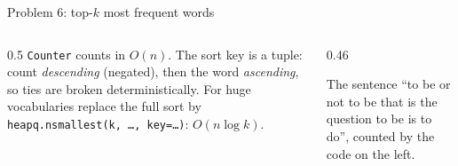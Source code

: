 \documentclass[aspectratio=169,10pt]{beamer}
\begin{document}
\begin{frame}{Problem 6: top-$k$ most frequent words}
\begin{columns}[T]
\begin{column}{0.5\textwidth}
\vspace{2mm}
\vspace{2mm}
{\small
\texttt{Counter} counts in $O(n)$. The sort key is a tuple: count \emph{descending} (negated), then the word \emph{ascending}, so ties are broken deterministically. For huge vocabularies replace the full sort by \texttt{heapq.nsmallest(k, \dots, key=\dots)}: $O(n\log k)$.}
\end{column}
\begin{column}{0.46\textwidth}
\begin{sfig}[0.7]
\end{sfig}
{\tiny The sentence ``to be or not to be that is the question to be is to do'', counted by the code on the left.}
\end{column}
\end{columns}
\end{frame}
\end{document}
